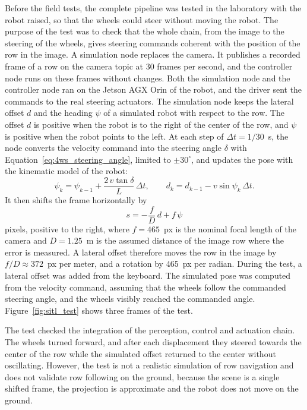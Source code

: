 Before the field tests, the complete pipeline was tested in the laboratory with the robot raised, so that the wheels could steer without moving the robot. The purpose of the test was to check that the whole chain, from the image to the steering of the wheels, gives steering commands coherent with the position of the row in the image. A simulation node replaces the camera. It publishes a recorded frame of a row on the camera topic at 30 frames per second, and the controller node runs on these frames without changes. Both the simulation node and the controller node ran on the Jetson AGX Orin of the robot, and the driver sent the commands to the real steering actuators. The simulation node keeps the lateral offset $d$ and the heading $\psi$ of a simulated robot with respect to the row. The offset $d$ is positive when the robot is to the right of the center of the row, and $\psi$ is positive when the robot points to the left. At each step of $\Delta t = 1/30$~s, the node converts the velocity command into the steering angle $\delta$ with Equation~\eqref{eq:4ws_steering_angle}, limited to $\pm 30^\circ$, and updates the pose with the kinematic model of the robot:
\begin{equation}
    \psi_k = \psi_{k-1} + \frac{2\, v \tan\delta}{L}\, \Delta t, \qquad
    d_k = d_{k-1} - v \sin\psi_k\, \Delta t.
    \label{eq:sitl_pose}
\end{equation}
It then shifts the frame horizontally by
\begin{equation}
    s = -\frac{f}{D}\, d + f\, \psi
    \label{eq:sitl_shift}
\end{equation}
pixels, positive to the right, where $f = 465$~px is the nominal focal length of the camera and $D = 1.25$~m is the assumed distance of the image row where the error is measured. A lateral offset therefore moves the row in the image by $f/D \approx 372$~px per meter, and a rotation by 465~px per radian. During the test, a lateral offset was added from the keyboard. The simulated pose was computed from the velocity command, assuming that the wheels follow the commanded steering angle, and the wheels visibly reached the commanded angle. Figure~\ref{fig:sitl_test} shows three frames of the test.

The test checked the integration of the perception, control and actuation chain. The wheels turned forward, and after each displacement they steered towards the center of the row while the simulated offset returned to the center without oscillating. However, the test is not a realistic simulation of row navigation and does not validate row following on the ground, because the scene is a single shifted frame, the projection is approximate and the robot does not move on the ground.

